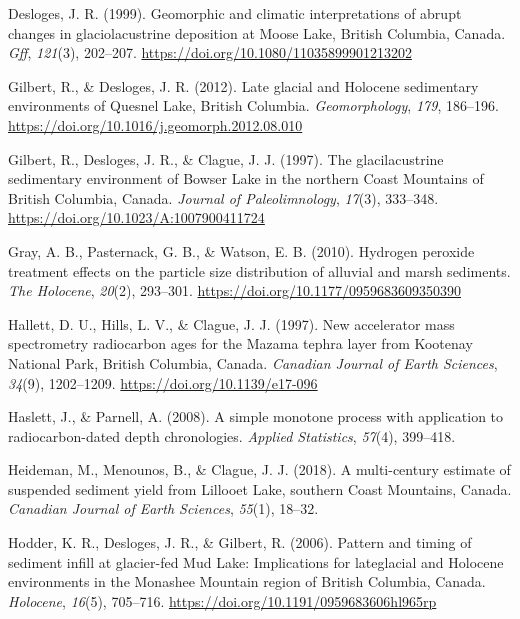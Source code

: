 \documentclass[
  letterpaper,
  DIV=11,
  numbers=noendperiod]{scrartcl}
\newlength{\cslhangindent}
\newlength{\cslentryspacingunit} %
\newenvironment{CSLReferences}[2] %
 {%
  \setlength{\parindent}{0pt}
  \ifodd #1
  \let\oldpar\par
  \def\par{\hangindent=\cslhangindent\oldpar}
  \fi
  \setlength{\parskip}{#2\cslentryspacingunit}
 }%
 {}
\begin{document}
\begin{CSLReferences}{1}{0}
\leavevmode{}%
Desloges, J. R. (1999). {Geomorphic and climatic interpretations of
abrupt changes in glaciolacustrine deposition at Moose Lake, British
Columbia, Canada}. \emph{Gff}, \emph{121}(3), 202--207.
\url{https://doi.org/10.1080/11035899901213202}

\leavevmode{}%
Gilbert, R., \& Desloges, J. R. (2012). {Late glacial and Holocene
sedimentary environments of Quesnel Lake, British Columbia}.
\emph{Geomorphology}, \emph{179}, 186--196.
\url{https://doi.org/10.1016/j.geomorph.2012.08.010}

\leavevmode{}%
Gilbert, R., Desloges, J. R., \& Clague, J. J. (1997). {The
glacilacustrine sedimentary environment of Bowser Lake in the northern
Coast Mountains of British Columbia, Canada}. \emph{Journal of
Paleolimnology}, \emph{17}(3), 333--348.
\url{https://doi.org/10.1023/A:1007900411724}

\leavevmode{}%
Gray, A. B., Pasternack, G. B., \& Watson, E. B. (2010). {Hydrogen
peroxide treatment effects on the particle size distribution of alluvial
and marsh sediments}. \emph{The Holocene}, \emph{20}(2), 293--301.
\url{https://doi.org/10.1177/0959683609350390}

\leavevmode{}%
Hallett, D. U., Hills, L. V., \& Clague, J. J. (1997). {New accelerator
mass spectrometry radiocarbon ages for the Mazama tephra layer from
Kootenay National Park, British Columbia, Canada}. \emph{Canadian
Journal of Earth Sciences}, \emph{34}(9), 1202--1209.
\url{https://doi.org/10.1139/e17-096}

\leavevmode{}%
Haslett, J., \& Parnell, A. (2008). {A simple monotone process with
application to radiocarbon-dated depth chronologies}. \emph{Applied
Statistics}, \emph{57}(4), 399--418.

\leavevmode{}%
Heideman, M., Menounos, B., \& Clague, J. J. (2018). {A multi-century
estimate of suspended sediment yield from Lillooet Lake, southern Coast
Mountains, Canada}. \emph{Canadian Journal of Earth Sciences},
\emph{55}(1), 18--32.

\leavevmode{}%
Hodder, K. R., Desloges, J. R., \& Gilbert, R. (2006). {Pattern and
timing of sediment infill at glacier-fed Mud Lake: Implications for
lateglacial and Holocene environments in the Monashee Mountain region of
British Columbia, Canada}. \emph{Holocene}, \emph{16}(5), 705--716.
\url{https://doi.org/10.1191/0959683606hl965rp}


\end{CSLReferences}
\end{document}
